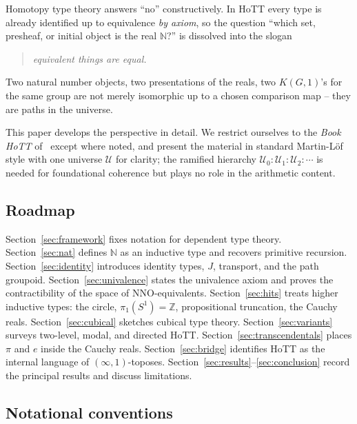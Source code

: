 \documentclass[12pt]{article}
\theoremstyle{definition}
\theoremstyle{remark}
\newcommand{\U}{\mathcal{U}}
\newcommand{\N}{\mathbb{N}}
\newcommand{\Z}{\mathbb{Z}}
\newcommand{\Sone}{S^1}
\begin{document}
Homotopy type theory answers ``no'' constructively. In HoTT every type is
already identified up to equivalence \emph{by axiom}, so the question
``which set, presheaf, or initial object is the real $\N$?'' is dissolved
into the slogan
\begin{quote}
\centering
\emph{equivalent things are equal.}
\end{quote}
Two natural number objects, two presentations of the reals, two $K(G,1)$'s
for the same group are not merely isomorphic up to a chosen comparison map
-- they are paths in the universe.

This paper develops the perspective in detail. We restrict ourselves to the
\emph{Book HoTT} of~\cite{HoTTBook} except where noted, and present the
material in standard Martin-L\"of style with one universe $\U$ for clarity;
the ramified hierarchy $\U_0 : \U_1 : \U_2 : \cdots$ is needed for
foundational coherence but plays no role in the arithmetic content.

\subsection{Roadmap}

Section~\ref{sec:framework} fixes notation for dependent type theory.
Section~\ref{sec:nat} defines $\N$ as an inductive type and recovers
primitive recursion. Section~\ref{sec:identity} introduces identity types,
$J$, transport, and the path groupoid. Section~\ref{sec:univalence} states
the univalence axiom and proves the contractibility of the space of
NNO-equivalents. Section~\ref{sec:hits} treats higher inductive types: the
circle, $\pi_1(\Sone{}) = \Z$, propositional truncation, the Cauchy reals.
Section~\ref{sec:cubical} sketches cubical type theory.
Section~\ref{sec:variants} surveys two-level, modal, and directed HoTT\@.
Section~\ref{sec:transcendentals} places $\pi$ and $e$ inside the Cauchy
reals. Section~\ref{sec:bridge} identifies HoTT as the internal language of
$(\infty,1)$-toposes. Section~\ref{sec:results}--\ref{sec:conclusion} record
the principal results and discuss limitations.

\subsection{Notational conventions}
\label{sec:conventions}
\end{document}
